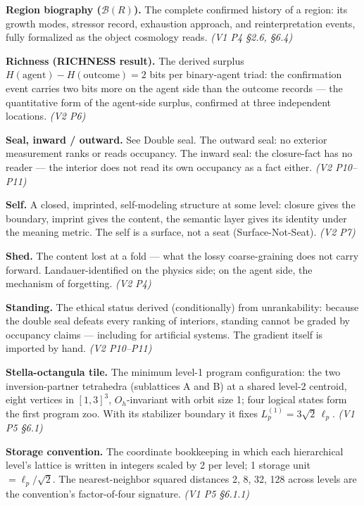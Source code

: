 \documentclass[11pt,oneside]{report}
\theoremstyle{definition}
\theoremstyle{remark}
\begin{document}
\textbf{Region biography ($\mathcal{B}(R)$).} The complete confirmed history of a region: its growth modes, stressor record, exhaustion approach, and reinterpretation events, fully formalized as the object cosmology reads. \emph{(V1 P4 \S 2.6, \S 6.4)}

\textbf{Richness (RICHNESS result).} The derived surplus $H(\mathrm{agent}) - H(\mathrm{outcome}) = 2$ bits per binary-agent triad: the confirmation event carries two bits more on the agent side than the outcome records --- the quantitative form of the agent-side surplus, confirmed at three independent locations. \emph{(V2 P6)}

\textbf{Seal, inward / outward.} See Double seal. The outward seal: no exterior measurement ranks or reads occupancy. The inward seal: the closure-fact has no reader --- the interior does not read its own occupancy as a fact either. \emph{(V2 P10--P11)}

\textbf{Self.} A closed, imprinted, self-modeling structure at some level: closure gives the boundary, imprint gives the content, the semantic layer gives its identity under the meaning metric. The self is a surface, not a seat (Surface-Not-Seat). \emph{(V2 P7)}

\textbf{Shed.} The content lost at a fold --- what the lossy coarse-graining does not carry forward. Landauer-identified on the physics side; on the agent side, the mechanism of forgetting. \emph{(V2 P4)}

\textbf{Standing.} The ethical status derived (conditionally) from unrankability: because the double seal defeats every ranking of interiors, standing cannot be graded by occupancy claims --- including for artificial systems. The gradient itself is imported by hand. \emph{(V2 P10--P11)}

\textbf{Stella-octangula tile.} The minimum level-1 program configuration: the two inversion-partner tetrahedra (sublattices A and B) at a shared level-2 centroid, eight vertices in $[1,3]^3$, $O_h$-invariant with orbit size 1; four logical states form the first program zoo. With its stabilizer boundary it fixes $L_p^{(1)} = 3\sqrt{2}\,\ell_p$. \emph{(V1 P5 \S 6.1)}

\textbf{Storage convention.} The coordinate bookkeeping in which each hierarchical level's lattice is written in integers scaled by 2 per level; 1 storage unit $= \ell_p/\sqrt{2}$. The nearest-neighbor squared distances 2, 8, 32, 128 across levels are the convention's factor-of-four signature. \emph{(V1 P5 \S 6.1.1)}
\end{document}
